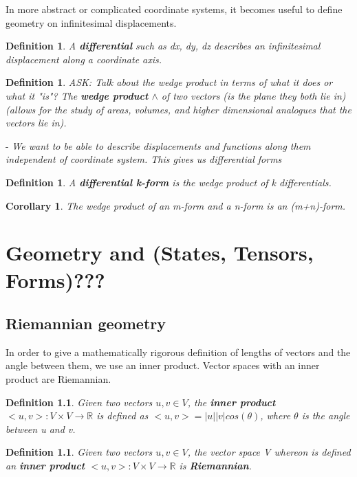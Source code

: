 \documentclass{book}
\newtheorem{defn}[equation]{Definition}
\newtheorem{coro}[equation]{Corollary}
\begin{document}
In more abstract or complicated coordinate systems, it becomes useful to define geometry on infinitesimal displacements. 

\begin{defn}
	A \textbf{differential} such as dx, dy, dz describes an infinitesimal displacement along a coordinate axis. 
\end{defn}

\begin{defn}
	ASK: \emph{Talk about the wedge product in terms of what it does or what it "is"?}
	The \textbf{wedge product} $\wedge$ of two vectors (is the plane they both lie in) (allows for the study of areas, volumes, and higher dimensional analogues that the vectors lie in). 
\end{defn}

- \emph{We want to be able to describe displacements and functions along them independent of coordinate system. This gives us differential forms}


\begin{defn}
	A \textbf{differential k-form} is the wedge product of k differentials. 
\end{defn}

\begin{coro}
	The wedge product of an m-form and a n-form is an (m+n)-form. 
\end{coro}


\chapter{Geometry and (States, Tensors, Forms)???}

\section{Riemannian geometry}
In order to give a mathematically rigorous definition of lengths of vectors and the angle between them, we use an inner product. Vector spaces with an inner product are Riemannian.

\begin{defn}
	Given two vectors $u,v \in V$, the \textbf{inner product} $<u,v> : V \times V \to \mathbb{R}$ is defined as $<u,v> = |u||v|cos(\theta)$, where $\theta$ is the angle between u and v. 
\end{defn}
\begin{defn}
	Given two vectors $u,v \in V$, the vector space V whereon is defined an \textbf{inner product} $<u,v> : V \times V \to \mathbb{R}$ is \textbf{Riemannian}.
	\end{defn}
\end{document}
